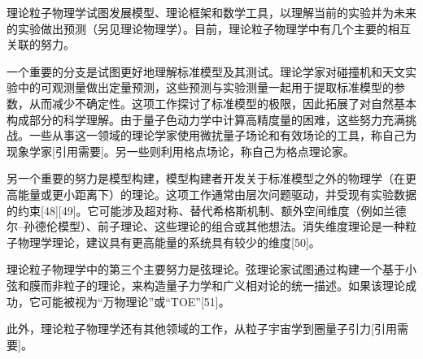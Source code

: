 理论粒子物理学试图发展模型、理论框架和数学工具，以理解当前的实验并为未来的实验做出预测（另见理论物理学）。目前，理论粒子物理学中有几个主要的相互关联的努力。

一个重要的分支是试图更好地理解标准模型及其测试。理论学家对碰撞机和天文实验中的可观测量做出定量预测，这些预测与实验测量一起用于提取标准模型的参数，从而减少不确定性。这项工作探讨了标准模型的极限，因此拓展了对自然基本构成部分的科学理解。由于量子色动力学中计算高精度量的困难，这些努力充满挑战。一些从事这一领域的理论学家使用微扰量子场论和有效场论的工具，称自己为现象学家[引用需要]。另一些则利用格点场论，称自己为格点理论家。

另一个重要的努力是模型构建，模型构建者开发关于标准模型之外的物理学（在更高能量或更小距离下）的理论。这项工作通常由层次问题驱动，并受现有实验数据的约束[48][49]。它可能涉及超对称、替代希格斯机制、额外空间维度（例如兰德尔–孙德伦模型）、前子理论、这些理论的组合或其他想法。消失维度理论是一种粒子物理学理论，建议具有更高能量的系统具有较少的维度[50]。

理论粒子物理学中的第三个主要努力是弦理论。弦理论家试图通过构建一个基于小弦和膜而非粒子的理论，来构造量子力学和广义相对论的统一描述。如果该理论成功，它可能被视为“万物理论”或“TOE”[51]。

此外，理论粒子物理学还有其他领域的工作，从粒子宇宙学到圈量子引力[引用需要]。